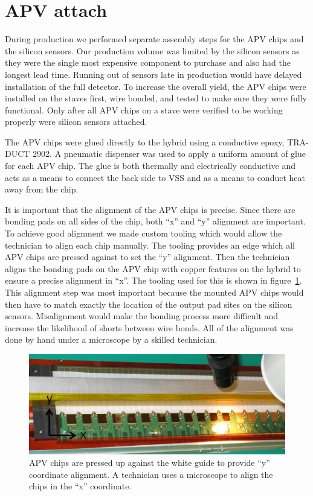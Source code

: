 \documentclass[preprint,12pt]{elsarticle}
\begin{document}
\section{APV attach}
During production we performed separate assembly steps for the APV chips and the
silicon sensors. Our production volume was limited by the silicon sensors as they were
the single most expensive component to purchase and also had the longest lead
time. Running out of sensors late in production would have delayed installation
of the full detector. To increase the overall yield, the APV chips were
installed on the staves first, wire bonded, and tested to make sure they were
fully functional. Only after all APV chips on a stave were verified to be
working properly were silicon sensors attached.

The APV chips were glued directly to the hybrid using a conductive epoxy, TRA-DUCT
2902. A pneumatic dispenser was used to apply a uniform amount of glue for each
APV chip. The glue is both thermally and electrically conductive and acts as a
means to connect the back side to VSS and as a means to conduct heat away from
the chip.

It is important that the alignment of the APV chips is precise. Since there are
bonding pads on all sides of the chip, both ``x'' and ``y'' alignment are important.
To achieve good alignment we made custom tooling which would allow the
technician to align each chip manually. The tooling provides an edge which all
APV chips are pressed against to set the ``y'' alignment. Then the technician
aligns the bonding pads on the APV chip with copper features on the hybrid to
ensure a precise alignment in ``x''. The tooling used for this is shown in
figure~\ref{fig:apv_attach}. This alignment step was most important
because the mounted APV chips would then have to match exactly the location of
the output pad sites on the silicon sensors. Misalignment would make the bonding
process more difficult and increase the likelihood of shorts between wire bonds.
All of the alignment was done by hand under a microscope by a skilled
technician.

\begin{figure}[h]
\begin{center}
\includegraphics[width=5in, keepaspectratio=true, angle=0]{graphics/apv_attach_tooling.jpg}
\caption{APV chips are pressed up against the white guide to provide ``y'' coordinate
alignment.  A technician uses a microscope to align the chips in the ``x'' coordinate.
\label{fig:apv_attach}}
\end{center}
\end{figure}
%
\end{document}
